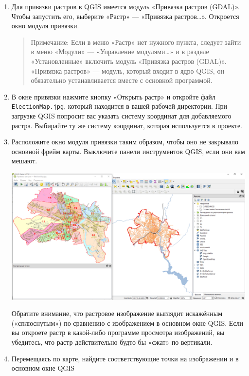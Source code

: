 \documentclass[
  12pt,
]{book}
\begin{document}
\begin{enumerate}
\def\labelenumi{\arabic{enumi}.}
\item
  Для привязки растров в QGIS имеется модуль «Привязка растров (GDAL)». Чтобы запустить его, выберите «Растр» --- «Привязка растров\ldots». Откроется окно модуля привязки.

  \begin{quote}
  Примечание: Если в меню «Растр» нет нужного пункта, следует зайти в меню «Модули» --- «Управление модулями\ldots» и в разделе «Установленные» включить модуль «Привязка растров (GDAL)». «Привязка растров» --- модуль, который входит в ядро QGIS, он обязательно устанавливается вместе с основной программой.
  \end{quote}
\item
  В окне привязки нажмите кнопку «Открыть растр» и откройте файл \texttt{ElectionMap.jpg}, который находится в вашей рабочей директории. При загрузке QGIS попросит вас указать систему координат для добавляемого растра. Выбирайте ту же систему координат, которая используется в проекте.
\item
  Расположите окно модуля привязки таким образом, чтобы оно не закрывало основной фрейм карты. Выключите панели инструментов QGIS, если они вам мешают.

  \includegraphics{images/Ex05/Reference1.png}

  Обратите внимание, что растровое изображение выглядит искажённым («сплюснутым») по сравнению с изображением в основном окне QGIS. Если вы откроете растр в какой-либо программе просмотра изображений, вы убедитесь, что растр действительно будто бы «сжат» по вертикали.
\item
  Перемещаясь по карте, найдите соответствующие точки на изображении и в основном окне QGIS


\end{enumerate}
\end{document}
